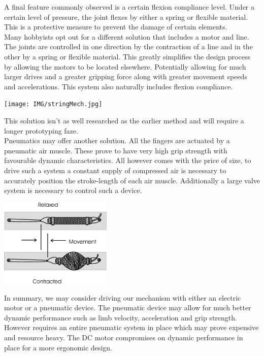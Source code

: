 \documentclass{article}
\begin{document}
A final feature commonly observed is a certain flexion compliance level. Under a certain level of pressure, the joint flexes by either a spring or flexible material. This is a protective measure to prevent the damage of certain elements.\\

Many hobbyists opt out for a different solution that includes a motor and line. The joints are controlled in one direction by the contraction of a line and in the other by a spring or flexible material. This greatly simplifies the design process by allowing the motors to be located elsewhere. Potentially allowing for much larger drives and a greater gripping force along with greater movement speeds and accelerations. This system also naturally includes flexion compliance.

\begin{center}
\texttt{[image: IMG/stringMech.jpg]}
\end{center}

This solution isn't as well researched as the earlier method and will require a longer prototyping faze. \\

Pneumatics may offer another solution. All the fingers are actuated by a pneumatic air muscle. These prove to have very high grip strength with favourable dynamic characteristics. All however comes with the price of size, to drive such a system a constant supply of compressed air is necessary to accurately position the stroke-length of each air muscle. Additionally a large valve system is necessary to control such a device.


\begin{center}
\includegraphics[width=0.4\textwidth]{IMG/airMuscle.jpg}
\end{center}
\break
In summary, we may consider driving our mechanism with either an electric motor or a pneumatic device. The pneumatic device may allow for much better dynamic performance such as limb velocity, acceleration and grip strength. However requires an entire pneumatic system in place which may prove expensive and resource heavy. The DC motor compromises on dynamic performance in place for a more ergonomic design.
\end{document}
